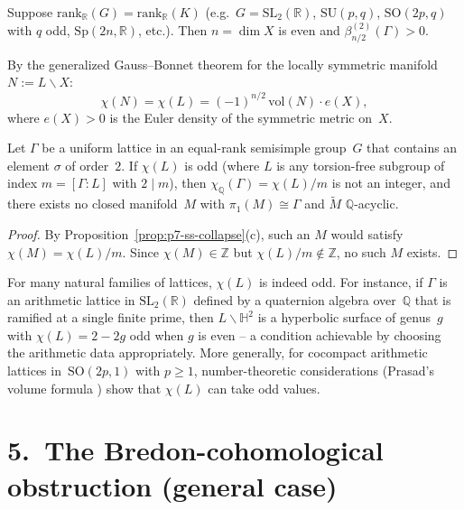 Suppose $\mathrm{rank}_\mathbb{R}(G)=\mathrm{rank}_\mathbb{R}(K)$
(e.g.\ $G=\mathrm{SL}_2(\mathbb{R})$, $\mathrm{SU}(p,q)$, $\mathrm{SO}(2p,q)$
with $q$ odd, $\mathrm{Sp}(2n,\mathbb{R})$, etc.).
Then $n=\dim X$ is even and $\beta_{n/2}^{(2)}(\Gamma)>0$.

By the generalized Gauss--Bonnet theorem for the locally symmetric manifold
$N := L\backslash X$:
\[
  \chi(N) = \chi(L) = (-1)^{n/2}\,\mathrm{vol}(N)\cdot e(X),
\]
where $e(X)>0$ is the Euler density of the symmetric metric on~$X$.

\begin{proposition}
\label{prop:p7-euler-parity}
Let $\Gamma$ be a uniform lattice in an equal-rank semisimple group~$G$ that
contains an element $\sigma$ of order~$2$. If $\chi(L)$ is odd (where $L$ is
any torsion-free subgroup of index $m=[\Gamma:L]$ with $2\mid m$), then
$\chi_\mathbb{Q}(\Gamma)=\chi(L)/m$ is not an integer, and there exists no
closed manifold~$M$ with $\pi_1(M)\cong\Gamma$ and $\widetilde{M}$
$\mathbb{Q}$-acyclic.
\end{proposition}

\begin{proof}
By Proposition~\ref{prop:p7-ss-collapse}(c), such an $M$ would satisfy
$\chi(M)=\chi(L)/m$. Since $\chi(M)\in\mathbb{Z}$ but $\chi(L)/m\notin\mathbb{Z}$,
no such $M$ exists.
\end{proof}

\begin{remark}
For many natural families of lattices, $\chi(L)$ is indeed odd. For instance,
if $\Gamma$ is an arithmetic lattice in $\mathrm{SL}_2(\mathbb{R})$ defined by
a quaternion algebra over~$\mathbb{Q}$ that is ramified at a single finite
prime, then $L\backslash\mathbb{H}^2$ is a hyperbolic surface of genus~$g$
with $\chi(L) = 2-2g$ odd when $g$ is even -- a condition achievable by
choosing the arithmetic data appropriately. More generally, for cocompact
arithmetic lattices in~$\mathrm{SO}(2p,1)$ with $p\ge 1$, number-theoretic
considerations (Prasad's volume formula \cite{Prasad89}) show that $\chi(L)$
can take odd values.
\end{remark}

\section*{5.\ The Bredon-cohomological obstruction (general case)}
\label{sec:p7-bredon}


